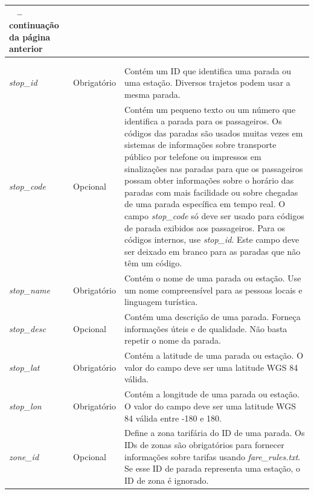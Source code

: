\documentclass[
	12pt,				%
	oneside,			%
	a4paper,			%
	english,			%
	brazil				%
	]{abntex2ppgsi}
\begin{document}
{{\begin{apendicesenv}
\begin{longtable}[!htb]{>{\centering\arraybackslash}m{3.8cm} | >{\centering}m{2.5cm} | >{\centering\arraybackslash}m{8.5cm}}
\multicolumn{3}{c}%
{{\bfseries \tablename\ \thetable{} -- continuação da página anterior}} \\
\hline \multicolumn{1}{>{\centering\arraybackslash}m{3.8cm} |}{\textbf{Nome do campo}} & \multicolumn{1}{>{\centering}m{2.5cm} |}{\textbf{Condicional}} & \multicolumn{1}{>{\centering\arraybackslash}m{8.5cm}}{\textbf{Descrição}}  \\ \hline 
\endhead

\hline \multicolumn{3}{c}{{Continua na próxima página}} \\
\endfoot

\hline \hline
\endlastfoot     
      
\hline
\textit{stop\_id} & Obrigatório & Contém um ID que identifica uma parada ou uma estação. Diversos trajetos podem usar a mesma parada. \\
\hline
\textit{stop\_code} & Opcional & Contém um pequeno texto ou um número que identifica a parada para os passageiros. Os códigos das paradas são usados muitas vezes em sistemas de informações sobre transporte público por telefone ou impressos em sinalizações nas paradas para que os passageiros possam obter informações sobre o horário das paradas com mais facilidade ou sobre chegadas de uma parada específica em tempo real. O campo \textit{stop\_code} só deve ser usado para códigos de parada exibidos aos passageiros. Para os códigos internos, use \textit{stop\_id}. Este campo deve ser deixado em branco para as paradas que não têm um código. \\
\hline
\textit{stop\_name} & Obrigatório & Contém o nome de uma parada ou estação. Use um nome compreensível para as pessoas locais e linguagem turística. \\
\hline
\textit{stop\_desc} & Opcional & Contém uma descrição de uma parada. Forneça informações úteis e de qualidade. Não basta repetir o nome da parada. \\
\hline
\textit{stop\_lat} & Obrigatório & Contém a latitude de uma parada ou estação. O valor do campo deve ser uma latitude WGS 84 válida. \\
\hline
\textit{stop\_lon} & Obrigatório & Contém a longitude de uma parada ou estação. O valor do campo deve ser uma latitude WGS 84 válida entre -180 e 180. \\
\hline
\textit{zone\_id} & Opcional & Define a zona tarifária do ID de uma parada. Os IDs de zonas são obrigatórios para fornecer informações sobre tarifas usando \textit{fare\_rules.txt}. Se esse ID de parada representa uma estação, o ID de zona é ignorado. \\

\end{longtable}
\end{apendicesenv}}}
\end{document}
